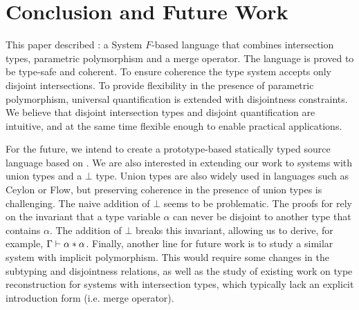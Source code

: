 \section{Conclusion and Future Work}
\label{sec:conclusion}

This paper described \name: a System $F$-based language that combines
intersection types, parametric polymorphism and a merge operator.
The language is proved to be type-safe and coherent.
To ensure coherence the type system accepts only
disjoint intersections. To provide flexibility in the presence of parametric polymorphism,
universal quantification is extended with
disjointness constraints. We believe that disjoint intersection types
and disjoint quantification are intuitive, and at the same time
flexible enough to enable practical applications.


For the future, we intend to create a prototype-based statically typed
source language based on \name.  We are also interested in extending
our work to systems with union types and a $\bot$ type. Union types
are also widely used in languages such as Ceylon or Flow, but
preserving coherence in the presence of union types is
challenging. The naive addition of $\bot$ seems to be problematic. 
The proofs for \name rely on the invariant that a type variable $\alpha$ can never be disjoint 
to another type that contains $\alpha$. The addition of $\bot$ breaks
this invariant, allowing us to derive, for example, $\Gamma \vdash \alpha * \alpha$.
Finally, another line for future work is to study a similar system with 
implicit polymorphism.
This would require some changes in the subtyping and disjointness relations,
as well as the study of existing work on type reconstruction for systems with 
intersection types, which typically lack an explicit introduction form 
(i.e. merge operator).




